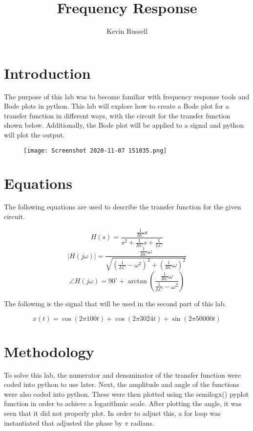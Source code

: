 \documentclass[12pt, titlepage]{article}
\author{Kevin Russell}
\title{Frequency Response}
\date{\parbox{\linewidth}{\centering%
  \experimentDate
  \endgraf\bigskip
  \className\ -- Section \sectionNumber\
}}
\begin{document}
 \newpage
	    \maketitle
\newpage
    \tableofcontents
    
\newpage
    \section{Introduction}    
    The purpose of this lab was to become familiar with frequency response tools and Bode plots in python.  This lab will explore how to create a Bode plot for a transfer function in different ways, with the circuit for the transfer function shown below.  Additionally, the Bode plot will be applied to a signal and python will plot the output.
    
    \begin{figure}[h!]
        \centering
        \texttt{[image: Screenshot 2020-11-07 151035.png]}
        \label{fig:my_label}
    \end{figure}
    \clearpage
    \section{Equations}
    The following equations are used to describe the transfer function for the given circuit.
    
    \begin{equation}
       H(s) = \frac{\frac{1}{RC}s}{s^2 +\frac{1}{RC}s+\frac{1}{LC}}    
    \end{equation}
    \begin{equation}
          |H(j\omega)| = \frac{\frac{1}{RC}\omega}{\sqrt{(\frac{1}{LC}-\omega^2)^2+(\frac{1}{RC}\omega)^2}}
    \end{equation}
     \begin{equation}
          \angle H(j\omega) = 90^\circ +\arctan{(\frac{\frac{1}{RC}\omega}{\frac{1}{LC}-\omega^2})}
      \end{equation}
      
      The following is the signal that will be used in the second part of this lab.
      
      \begin{equation}
          x(t) = \cos{(2\pi 100t)}+ \cos{(2\pi 3024t)} + \sin{(2\pi 50000t)}
      \end{equation}
    
    \section{Methodology}
    To solve this lab, the numerator and denominator of the transfer function were coded into python to use later.  Next, the amplitude and angle of the functions were also coded into python.  These were then plotted using the semilogx() pyplot function in order to achieve a logarithmic scale.  After plotting the angle, it was seen that it did not properly plot.  In order to adjust this, a for loop was instantiated that adjusted the phase by $\pi$ radians. 
    
\end{document}
